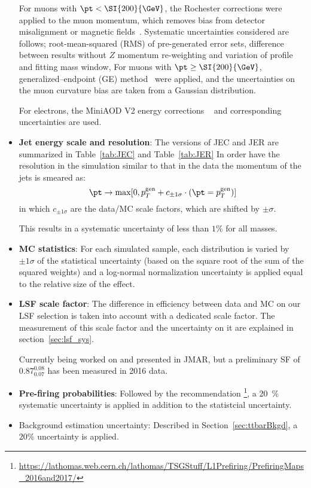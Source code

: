 \begin{itemize}
For muons with $\pt<\SI{200}{\GeV}$, the Rochester corrections were applied to the muon momentum,
which removes bias from detector misalignment or magnetic fields~\cite{muonrochcorpaper}.
Systematic uncertainties considered are follows; root-mean-squared (RMS) of pre-generated error sets, difference between results without $Z$ momentum re-weighting and variation of profile and fitting mass window,
For muons with $\pt\ge\SI{200}{\GeV}$, generalized--endpoint (GE) method~\cite{muonGEmethodpaper} were applied,
and the uncertainties on the muon curvature bias are taken from a Gaussian distribution.

For electrons, the MiniAOD V2 energy corrections ~\cite{EGMsmearings} and corresponding uncertainties are used.

  \item {\bf Jet energy scale and resolution}: 
The versions of JEC and JER are summarized in Table~\ref{tab:JEC} and Table~\ref{tab:JER}
 In order have the resolution in the simulation similar to that in the data the momentum of the jets is smeared as:
   \begin{equation}
     \pt \rightarrow  \mathrm{max} [0, p^{\mathrm{gen}}_{T} + c_{\pm 1 \sigma} \cdot (\pt = p^{\mathrm{gen}}_{T})]
   \end{equation}
in which $c_{\pm 1 \sigma}$ are the data/MC scale factors, which are shifted by $\pm \sigma$. 

This results in a systematic uncertainty of less than $1\%$ for all masses.

  \item {\bf MC statistics}:
For each simulated sample,  each distribution is varied by $\pm 1 \sigma$ of the statistical uncertainty (based on the square root of the sum of the squared weights) and a log-normal normalization uncertainty is applied equal to the relative size of the effect.

  \item {\bf LSF scale factor}:
The difference in efficiency between data and MC on our LSF selection is taken into account with a dedicated scale factor.
The measurement of this scale factor and the uncertainty on it are explained in section~\ref{sec:lsf_sys}.

{\color{red} Currently being worked on and presented in JMAR, but a preliminary SF of $0.87^{0.08}_{0.07}$ has been measured in 2016 data.}

  \item {\bf Pre-firing probabilities}:
Followed by the recommendation \footnote{\href{https://lathomas.web.cern.ch/lathomas/TSGStuff/L1Prefiring/PrefiringMaps\_2016and2017/}{https://lathomas.web.cern.ch/lathomas/TSGStuff/L1Prefiring/PrefiringMaps\_2016and2017/}}, a 20~\% systematic uncertainty is applied in addition to the statistcial uncertainty.


  \item {Background estimation uncertainty}:
Described in Section~\ref{sec:ttbarBkgd}, a $20\%$ uncertainty is applied.

\end{itemize}


